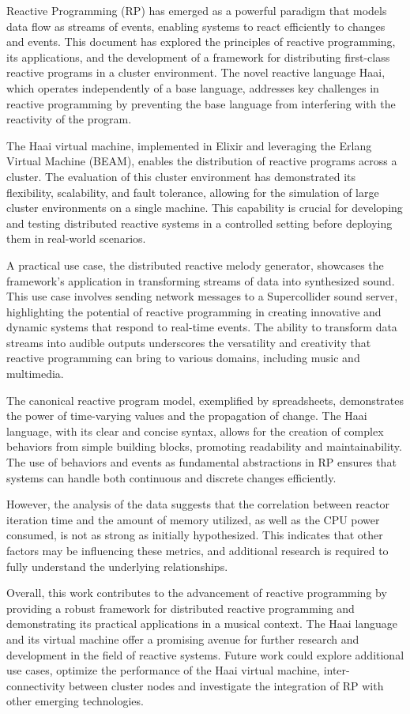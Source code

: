 \documentclass[a4paper]{book}
\begin{document}
Reactive Programming (RP) has emerged as a powerful paradigm that models data flow as streams of events, enabling systems to react efficiently to changes and events. This document has explored the principles of reactive programming, its applications, and the development of a framework for distributing first-class reactive programs in a cluster environment. The novel reactive language Haai, which operates independently of a base language, addresses key challenges in reactive programming by preventing the base language from interfering with the reactivity of the program.

The Haai virtual machine, implemented in Elixir and leveraging the Erlang Virtual Machine (BEAM), enables the distribution of reactive programs across a cluster. The evaluation of this cluster environment has demonstrated its flexibility, scalability, and fault tolerance, allowing for the simulation of large cluster environments on a single machine. This capability is crucial for developing and testing distributed reactive systems in a controlled setting before deploying them in real-world scenarios.

A practical use case, the distributed reactive melody generator, showcases the framework's application in transforming streams of data into synthesized sound. This use case involves sending network messages to a Supercollider sound server, highlighting the potential of reactive programming in creating innovative and dynamic systems that respond to real-time events. The ability to transform data streams into audible outputs underscores the versatility and creativity that reactive programming can bring to various domains, including music and multimedia.

The canonical reactive program model, exemplified by spreadsheets, demonstrates the power of time-varying values and the propagation of change. The Haai language, with its clear and concise syntax, allows for the creation of complex behaviors from simple building blocks, promoting readability and maintainability. The use of behaviors and events as fundamental abstractions in RP ensures that systems can handle both continuous and discrete changes efficiently.

However, the analysis of the data suggests that the correlation between reactor iteration time and the amount of memory utilized, as well as the CPU power consumed, is not as strong as initially hypothesized. This indicates that other factors may be influencing these metrics, and additional research is required to fully understand the underlying relationships.

Overall, this work contributes to the advancement of reactive programming by providing a robust framework for distributed reactive programming and demonstrating its practical applications in a musical context. The Haai language and its virtual machine offer a promising avenue for further research and development in the field of reactive systems. Future work could explore additional use cases, optimize the performance of the Haai virtual machine, inter-connectivity between cluster nodes and investigate the integration of RP with other emerging technologies.

\printbibliography
\end{document}

